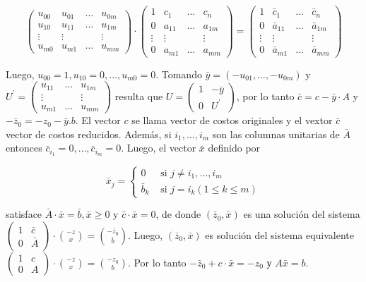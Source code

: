 \documentclass[10pt]{article}
\begin{document}
$$
\left(\begin{array}{cccc}
u_{00} & u_{01} & \ldots & u_{0 m} \\
u_{10} & u_{11} & \ldots & u_{1 m} \\
\vdots & \vdots & & \vdots \\
u_{m 0} & u_{m 1} & \ldots & u_{m m}
\end{array}\right) \cdot\left(\begin{array}{cccc}
1 & c_{1} & \ldots & c_{n} \\
0 & a_{11} & \ldots & a_{1 m} \\
\vdots & \vdots & & \vdots \\
0 & a_{m 1} & \ldots & a_{m m}
\end{array}\right)=\left(\begin{array}{cccc}
1 & \bar{c}_{1} & \ldots & \bar{c}_{n} \\
0 & \bar{a}_{11} & \ldots & \bar{a}_{1 m} \\
\vdots & \vdots & & \vdots \\
0 & \bar{a}_{m 1} & \ldots & \bar{a}_{m m}
\end{array}\right)
$$

Luego, $u_{00}=1, u_{10}=0, \ldots, u_{m 0}=0$. Tomando $\bar{y}=\left(-u_{01}, \ldots,-u_{0 m}\right)$ y $U^{\prime}=\left(\begin{array}{ccc}u_{11} & \ldots & u_{1 m} \\ \vdots & & \vdots \\ u_{m 1} & \ldots & u_{m m}\end{array}\right)$ resulta que $U=\left(\begin{array}{cc}1 & -\bar{y} \\ 0 & U^{\prime}\end{array}\right)$, por lo tanto $\bar{c}=c-\bar{y} \cdot A$ y $-\bar{z}_{0}=-z_{0}-\bar{y} . b$. El vector $c$ se llama vector de costos originales y el vextor $\bar{c}$ vector de costos reducidos. Además, si $i_{1}, \ldots, i_{m}$ son las columnas unitarias de $\bar{A}$ entonces $\bar{c}_{i_{1}}=0, \ldots, \bar{c}_{i_{m}}=0$. Luego, el vector $\bar{x}$ definido por

$$
\bar{x}_{j}= \begin{cases}0 & \text { si } j \neq i_{1}, \ldots, i_{m} \\ \bar{b}_{k} & \text { si } j=i_{k}(1 \leq k \leq m)\end{cases}
$$

satisface $\bar{A} \cdot \bar{x}=\bar{b}, \bar{x} \geq 0$ y $\bar{c} \cdot \bar{x}=0$, de donde $\left(\bar{z}_{0}, \bar{x}\right)$ es una solución del sistema $\left(\begin{array}{cc}1 & \bar{c} \\ 0 & \bar{A}\end{array}\right) \cdot\binom{-z}{x}=\binom{-\bar{z}_{0}}{\bar{b}}$. Luego, $\left(\bar{z}_{0}, \bar{x}\right)$ es solución del sistema equivalente $\left(\begin{array}{cc}1 & c \\ 0 & A\end{array}\right) \cdot\binom{-z}{x}=\binom{-z_{0}}{b}$. Por lo tanto $-\bar{z}_{0}+c \cdot \bar{x}=-z_{0}$ у $A \bar{x}=b$.
\end{document}
